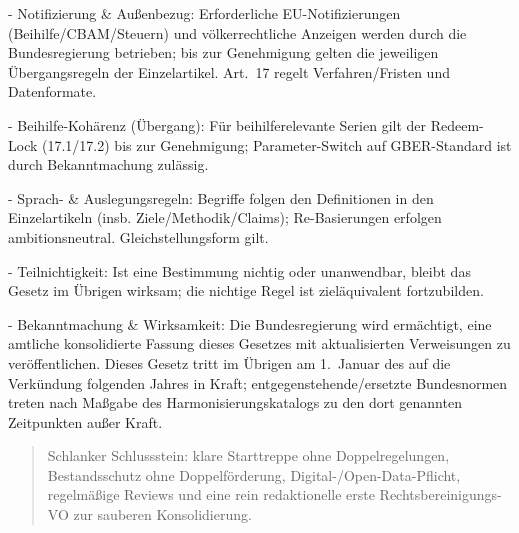 \documentclass[12pt,a4paper]{scrartcl}
\begin{document}
- Notifizierung \& Außenbezug: Erforderliche EU-Notifizierungen (Beihilfe/CBAM/Steuern) und völkerrechtliche Anzeigen werden durch die Bundesregierung betrieben; bis zur Genehmigung gelten die jeweiligen Übergangsregeln der Einzelartikel. Art. 17 regelt Verfahren/Fristen und Datenformate.

- Beihilfe-Kohärenz (Übergang): Für beihilferelevante Serien gilt der Redeem-Lock (17.1/17.2) bis zur Genehmigung; Parameter-Switch auf GBER-Standard ist durch Bekanntmachung zulässig.

- Sprach- \& Auslegungsregeln: Begriffe folgen den Definitionen in den Einzelartikeln (insb. Ziele/Methodik/Claims); Re-Basierungen erfolgen ambitionsneutral. Gleichstellungsform gilt.

- Teilnichtigkeit: Ist eine Bestimmung nichtig oder unanwendbar, bleibt das Gesetz im Übrigen wirksam; die nichtige Regel ist zieläquivalent fortzubilden.

- Bekanntmachung \& Wirksamkeit: Die Bundesregierung wird ermächtigt, eine amtliche konsolidierte Fassung dieses Gesetzes mit aktualisierten Verweisungen zu veröffentlichen. Dieses Gesetz tritt im Übrigen am 1. Januar des auf die Verkündung folgenden Jahres in Kraft; entgegenstehende/ersetzte Bundesnormen treten nach Maßgabe des Harmonisierungskatalogs zu den dort genannten Zeitpunkten außer Kraft.

{\footnotesize\begin{quote}
Schlanker Schlussstein: klare Starttreppe ohne Doppelregelungen, Bestandsschutz ohne Doppelförderung, Digital-/Open-Data-Pflicht, regelmäßige Reviews und eine rein redaktionelle erste Rechtsbereinigungs-VO zur sauberen Konsolidierung.
\end{quote}}
\end{document}
